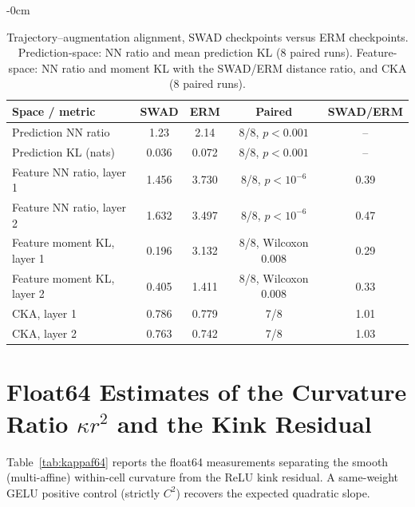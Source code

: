 \documentclass[electronics,article,submit,moreauthors]{Definitions/mdpi}
\newcommand{\add}[1]{\textcolor{addblue}{#1}}
\newcommand{\del}[1]{\textcolor{delred}{\st{#1}}}
\def\add#1{#1}
\def\del#1{}
\begin{document}
\begin{adjustwidth}{-\extralength}{0cm}
\begin{table}[H]
\centering
\caption{Trajectory--augmentation alignment, SWAD checkpoints versus ERM checkpoints. Prediction-space: NN ratio and mean prediction KL (8 paired runs). Feature-space: NN ratio and moment KL with the SWAD/ERM distance ratio, and CKA (8 paired runs).}
\label{tab:align}
\setlength{\tabcolsep}{4.5pt}
\footnotesize
\begin{tabular}{lcccc}
\toprule
\textbf{Space / metric} & \textbf{SWAD} & \textbf{ERM} & \textbf{Paired} & \textbf{SWAD/ERM}\\
\midrule
Prediction NN ratio & 1.23 & 2.14 & 8/8, $p<0.001$ & --\\
Prediction KL (nats) & 0.036 & 0.072 & 8/8, $p<0.001$ & --\\
\midrule
Feature NN ratio, layer 1 & 1.456 & 3.730 & 8/8, $p<10^{-6}$ & 0.39\\
Feature NN ratio, layer 2 & 1.632 & 3.497 & 8/8, $p<10^{-6}$ & 0.47\\
Feature moment KL, layer 1 & 0.196 & 3.132 & 8/8, Wilcoxon \del{.008}\add{0.008} & 0.29\\
Feature moment KL, layer 2 & 0.405 & 1.411 & 8/8, Wilcoxon \del{.008}\add{0.008} & 0.33\\
CKA, layer 1 & 0.786 & 0.779 & 7/8 & 1.01\\
CKA, layer 2 & 0.763 & 0.742 & 7/8 & 1.03\\
\bottomrule
\end{tabular}
\end{table}

\section{Float64 Estimates of the Curvature Ratio $\kappa r^2$ and the Kink Residual}
\label{sec:appkappa}

Table~\ref{tab:kappaf64} reports the float64 measurements separating the smooth (multi-affine) within-cell curvature from the ReLU kink residual. A same-weight GELU positive control (strictly $C^2$) recovers the expected quadratic slope.


\end{adjustwidth}
\end{document}
